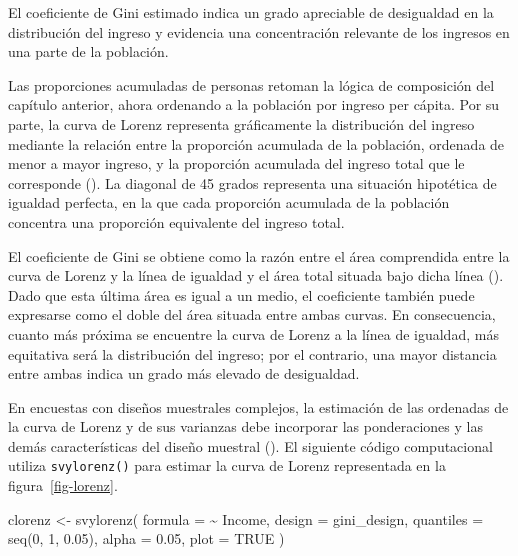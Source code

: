 \documentclass[
  spanish,
  11pt,
  letterpaper,
  oneside,
  open=any]{scrbook}
\newenvironment{Shaded}{\begin{snugshade}}{\end{snugshade}}
\newcommand{\AttributeTok}[1]{\textcolor[rgb]{0.40,0.45,0.13}{#1}}
\newcommand{\ConstantTok}[1]{\textcolor[rgb]{0.56,0.35,0.01}{#1}}
\newcommand{\DecValTok}[1]{\textcolor[rgb]{0.68,0.00,0.00}{#1}}
\newcommand{\FloatTok}[1]{\textcolor[rgb]{0.68,0.00,0.00}{#1}}
\newcommand{\FunctionTok}[1]{\textcolor[rgb]{0.28,0.35,0.67}{#1}}
\newcommand{\NormalTok}[1]{\textcolor[rgb]{0.00,0.23,0.31}{#1}}
\newcommand{\OtherTok}[1]{\textcolor[rgb]{0.00,0.23,0.31}{#1}}
\newcommand{\SpecialCharTok}[1]{\textcolor[rgb]{0.37,0.37,0.37}{#1}}
\begin{document}
El coeficiente de Gini estimado indica un grado apreciable de
desigualdad en la distribución del ingreso y evidencia una concentración
relevante de los ingresos en una parte de la población.

Las proporciones acumuladas de personas retoman la lógica de composición
del capítulo anterior, ahora ordenando a la población por ingreso per
cápita. Por su parte, la curva de Lorenz representa gráficamente la
distribución del ingreso mediante la relación entre la proporción
acumulada de la población, ordenada de menor a mayor ingreso, y la
proporción acumulada del ingreso total que le corresponde
(). La diagonal de 45 grados
representa una situación hipotética de igualdad perfecta, en la que cada
proporción acumulada de la población concentra una proporción
equivalente del ingreso total.

El coeficiente de Gini se obtiene como la razón entre el área
comprendida entre la curva de Lorenz y la línea de igualdad y el área
total situada bajo dicha línea ().
Dado que esta última área es igual a un medio, el coeficiente también
puede expresarse como el doble del área situada entre ambas curvas. En
consecuencia, cuanto más próxima se encuentre la curva de Lorenz a la
línea de igualdad, más equitativa será la distribución del ingreso; por
el contrario, una mayor distancia entre ambas indica un grado más
elevado de desigualdad.

En encuestas con diseños muestrales complejos, la estimación de las
ordenadas de la curva de Lorenz y de sus varianzas debe incorporar las
ponderaciones y las demás características del diseño muestral
(). El
siguiente código computacional utiliza \texttt{svylorenz()} para estimar
la curva de Lorenz representada en la figura~\ref{fig-lorenz}.

\begin{Shaded}
\begin{Highlighting}[]
\NormalTok{clorenz }\OtherTok{\textless{}{-}} \FunctionTok{svylorenz}\NormalTok{(}
  \AttributeTok{formula =} \SpecialCharTok{\textasciitilde{}}\NormalTok{ Income,}
  \AttributeTok{design =}\NormalTok{ gini\_design,}
  \AttributeTok{quantiles =} \FunctionTok{seq}\NormalTok{(}\DecValTok{0}\NormalTok{, }\DecValTok{1}\NormalTok{, }\FloatTok{0.05}\NormalTok{),}
  \AttributeTok{alpha =} \FloatTok{0.05}\NormalTok{,}
  \AttributeTok{plot =} \ConstantTok{TRUE}
\NormalTok{)}
\end{Highlighting}
\end{Shaded}
\end{document}
